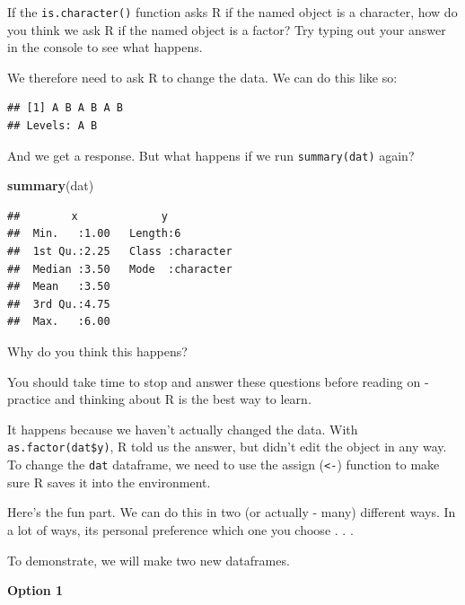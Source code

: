 \documentclass[
]{book}
\newenvironment{Shaded}{\begin{snugshade}}{\end{snugshade}}
\newcommand{\KeywordTok}[1]{\textcolor[rgb]{0.13,0.29,0.53}{\textbf{#1}}}
\newcommand{\NormalTok}[1]{#1}
\newcommand{\OperatorTok}[1]{\textcolor[rgb]{0.81,0.36,0.00}{\textbf{#1}}}
\begin{document}
If the \texttt{is.character()} function asks R if the named object is a character, how do you think we ask R if the named object is a factor? Try typing out your answer in the console to see what happens.

We therefore need to ask R to change the data. We can do this like so:

\begin{Shaded}
\end{Shaded}

\begin{verbatim}
## [1] A B A B A B
## Levels: A B
\end{verbatim}

And we get a response. But what happens if we run \texttt{summary(dat)} again?

\begin{Shaded}
\begin{Highlighting}[]
\KeywordTok{summary}\NormalTok{(dat)}
\end{Highlighting}
\end{Shaded}

\begin{verbatim}
##        x             y            
##  Min.   :1.00   Length:6          
##  1st Qu.:2.25   Class :character  
##  Median :3.50   Mode  :character  
##  Mean   :3.50                     
##  3rd Qu.:4.75                     
##  Max.   :6.00
\end{verbatim}

Why do you think this happens?

You should take time to stop and answer these questions before reading on - practice and thinking about R is the best way to learn.

It happens because we haven't actually changed the data. With \texttt{as.factor(dat\$y)}, R told us the answer, but didn't edit the object in any way. To change the \texttt{dat} dataframe, we need to use the assign (\texttt{\textless{}-}) function to make sure R saves it into the environment.

Here's the fun part. We can do this in two (or actually - many) different ways. In a lot of ways, its personal preference which one you choose . . .

To demonstrate, we will make two new dataframes.

\textbf{Option 1}
\end{document}
